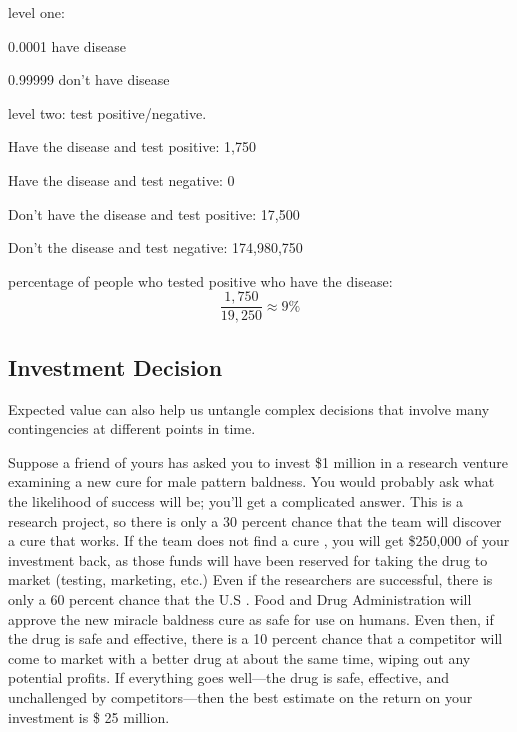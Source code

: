 \documentclass[landscape]{exam}
\begin{document}
  \begin{solution}
    level one:
    \begin{itemize*}
      \item 0.0001 have disease
      \item 0.99999 don't have disease
    \end{itemize*}

    level two: test positive/negative. 
    \begin{itemize*}
      \item Have the disease and test positive: 1,750
      \item Have the disease and test negative: 0
      \item Don't have the disease and test positive: 17,500
      \item Don't the disease and test negative: 174,980,750
    \end{itemize*}

    percentage of people who tested positive who have the disease:
    \[
      \frac{1,750}{19,250} \approx 9\%
    \]

  \end{solution}

  \subsection{Investment Decision}
  Expected value can also help us untangle complex decisions that involve many
  contingencies at different points in time. 

  Suppose a friend of yours has asked you to invest \$1 million in a research
  venture examining a new cure for male pattern baldness. You would probably ask
  what the likelihood of success will be; you’ll get a complicated answer. This
  is a research project, so there is only a 30 percent chance that the team will
  discover a cure that works. If the team does not find a cure , you will get
  \$250,000 of your investment back, as those funds will have been reserved for
  taking the drug to market (testing, marketing, etc.) Even if the researchers
  are successful, there is only a 60 percent chance that the U.S . Food and Drug
  Administration will approve the new miracle baldness cure as safe for use on
  humans. Even then, if the drug is safe and effective, there is a 10 percent
  chance that a competitor will come to market with a better drug at about the
  same time, wiping out any potential profits. If everything goes well---the drug
  is safe, effective, and unchallenged by competitors---then the best estimate
  on the return on your investment is \$ 25 million. 
\end{document}
